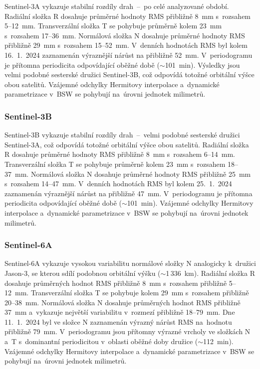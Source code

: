 Sentinel-3A vykazuje stabilní rozdíly drah \,--\, po celé analyzované 
období. Radiální složka R dosahuje průměrné hodnoty RMS přibližně 8~mm 
s~rozsahem 5--12~mm. Transverzální složka T se pohybuje průměrně kolem 
23~mm s~rozsahem 17--36~mm. Normálová složka N dosahuje průměrné hodnoty 
RMS přibližně 29~mm s~rozsahem 15--52~mm. V~denních hodnotách RMS byl 
kolem 16.~1.~2024 zaznamenán výraznější nárůst na přibližně 52~mm. 
V~periodogramu je přítomna periodicita odpovídající oběžné době 
($\sim$101~min). Výsledky jsou velmi podobné sesterské družici Sentinel-3B, 
což odpovídá totožné orbitální výšce obou satelitů. Vzájemné odchylky 
Hermitovy interpolace a~dynamické parametrizace v~BSW se pohybují 
na~úrovni jednotek milimetrů.

\subsubsection{Sentinel-3B}

Sentinel-3B vykazuje stabilní rozdíly drah \,--\, velmi podobné 
sesterské družici Sentinel-3A, což odpovídá totožné orbitální výšce 
obou satelitů. Radiální složka R dosahuje průměrné hodnoty RMS přibližně 
8~mm s~rozsahem 6--14~mm. Transverzální složka T se pohybuje průměrně 
kolem 23~mm s~rozsahem 18--37~mm. Normálová složka N dosahuje průměrné 
hodnoty RMS přibližně 25~mm s~rozsahem 14--47~mm. V~denních hodnotách 
RMS byl kolem 25.~1.~2024 zaznamenán výraznější nárůst na přibližně 
47~mm. V~periodogramu je přítomna periodicita odpovídající oběžné době 
($\sim$101~min). Vzájemné odchylky Hermitovy interpolace a~dynamické 
parametrizace v~BSW se pohybují na~úrovni jednotek milimetrů.

\subsubsection{Sentinel-6A}

Sentinel-6A vykazuje vysokou variabilitu normálové složky N analogicky k~družici Jason-3, se kterou sdílí podobnou orbitální výšku ($\sim$1\,336~km). Radiální složka R dosahuje průměrných hodnot RMS přibližně 8~mm s~rozsahem přibližně 5--12~mm. Transverzální složka T se pohybuje kolem 29~mm s~rozsahem přibližně 20--38~mm. Normálová složka N dosahuje průměrných hodnot RMS přibližně 37~mm a~vykazuje největší variabilitu v~rozmezí přibližně 18--79~mm. Dne 11.~1.~2024 byl ve složce N zaznamenán výrazný nárůst RMS na~hodnotu přibližně 79~mm. V~periodogramu jsou přítomny výrazné vrcholy ve složkách N a~T s~dominantní periodicitou v~oblasti oběžné doby družice ($\sim$112~min). Vzájemné odchylky Hermitovy interpolace a~dynamické parametrizace v~BSW se pohybují na~úrovni jednotek milimetrů.